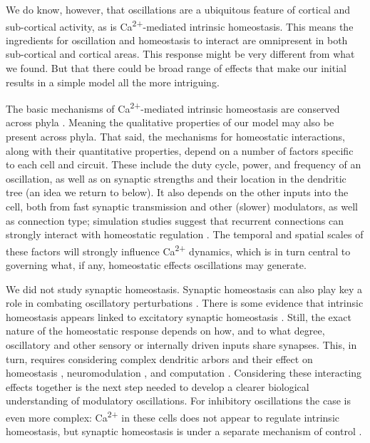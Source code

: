 \documentclass{article}
\begin{document}
We do know, however, that oscillations are a ubiquitous feature of cortical and sub-cortical activity, as is Ca\textsuperscript{2+}-mediated intrinsic homeostasis. This means the ingredients for oscillation and homeostasis to interact are omnipresent in both sub-cortical and cortical areas. This response might be very different from what we found. But that there could be broad range of effects that make our initial results in a simple model all the more intriguing. 

The basic mechanisms of Ca\textsuperscript{2+}-mediated intrinsic homeostasis are conserved across phyla \cite{Tran2017}. Meaning the qualitative properties of our model may also be present across phyla. That said, the mechanisms for homeostatic interactions, along with their quantitative properties, depend on a number of factors specific to each cell and circuit. These include the duty cycle, power, and frequency of an oscillation, as well as on synaptic strengths and their location in the dendritic tree (an idea we return to below). It also depends on the other inputs into the cell, both from fast synaptic transmission and other (slower) modulators, as well as connection type; simulation studies suggest that recurrent connections can strongly interact with homeostatic regulation \cite{Harnack2015}. The temporal and spatial scales of these factors will strongly influence Ca\textsuperscript{2+} dynamics, which is in turn central to governing what, if any, homeostatic effects oscillations may generate.

We did not study synaptic homeostasis. Synaptic homeostasis can also play key a role in combating oscillatory perturbations \cite{Cannon2016}. There is some evidence that intrinsic homeostasis appears linked to excitatory synaptic homeostasis \cite{Joseph2017}. Still, the exact nature of the homeostatic response depends on how, and to what degree, oscillatory and other sensory or internally driven inputs share synapses. This, in turn, requires considering complex dendritic arbors and their effect on homeostasis \cite{LeMasson1993}, neuromodulation \cite{Jadi2012,Jadi2014}, and computation \cite{Mainen1996,Polsky2004,Mel2004}. Considering these interacting effects together is the next step needed to develop a clearer biological understanding of modulatory oscillations. For inhibitory oscillations the case is even more complex: Ca\textsuperscript{2+} in these cells does not appear to regulate intrinsic homeostasis, but synaptic homeostasis is under a separate mechanism of control \cite{Joseph2017}.
\end{document}
